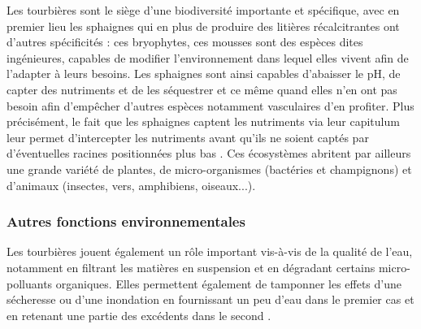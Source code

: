 Les tourbières sont le siège d'une biodiversité importante et spécifique, avec en premier lieu les sphaignes qui en plus de produire des litières récalcitrantes ont d'autres spécificités : 
ces bryophytes, ces mousses sont des espèces dites ingénieures, capables de modifier l'environnement dans lequel elles vivent afin de l'adapter à leurs besoins.
Les sphaignes sont ainsi capables d'abaisser le pH, de capter des nutriments et de les séquestrer et ce même quand elles n'en ont pas besoin afin d'empêcher d'autres espèces notamment vasculaires d'en profiter.
Plus précisément, le fait que les sphaignes captent les nutriments via leur capitulum leur permet d'intercepter les nutriments avant qu'ils ne soient captés par d'éventuelles racines positionnées plus bas \citep{malmer1994,svensson1995}.
Ces écosystèmes abritent par ailleurs une grande variété de plantes, de micro-organismes (bactéries et champignons) et d'animaux (insectes, vers, amphibiens, oiseaux...).

\subsubsection{Autres fonctions environnementales}

Les tourbières jouent également un rôle important vis-à-vis de la qualité de l'eau, notamment en filtrant les matières en suspension et en dégradant certains micro-polluants organiques.
Elles permettent également de tamponner les effets d'une sécheresse ou d'une inondation en fournissant un peu d'eau dans le premier cas et en retenant une partie des excédents dans le second \citep{joosten2002,parish2008}.


